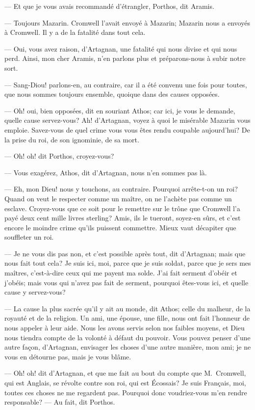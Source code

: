 — Et que je vous avais recommandé d'étrangler, Porthos, dit Aramis.

— Toujours Mazarin. Cromwell l'avait envoyé à Mazarin; Mazarin nous a envoyés à Cromwell. Il y a de la fatalité dans tout cela.

— Oui, vous avez raison, d'Artagnan, une fatalité qui nous divise et qui nous perd. Ainsi, mon cher Aramis, n'en parlons plus et préparons-nous à subir notre sort.

— Sang-Diou! parlons-en, au contraire, car il a été convenu une fois pour toutes, que nous sommes toujours ensemble, quoique dans des causes opposées.

— Oh! oui, bien opposées, dit en souriant Athos; car ici, je vous le demande, quelle cause servez-vous? Ah! d'Artagnan, voyez à quoi le misérable Mazarin vous emploie. Savez-vous de quel crime vous vous êtes rendu coupable aujourd'hui? De la prise du roi, de son ignominie, de sa mort.

— Oh! oh! dit Porthos, croyez-vous?

— Vous exagérez, Athos, dit d'Artagnan, nous n'en sommes pas là.

— Eh, mon Dieu! nous y touchons, au contraire. Pourquoi arrête-t-on un roi? Quand on veut le respecter comme un maître, on ne l'achète pas comme un esclave. Croyez-vous que ce soit pour le remettre sur le trône que Cromwell l'a payé deux cent mille livres sterling? Amis, ils le tueront, soyez-en sûrs, et c'est encore le moindre crime qu'ils puissent commettre. Mieux vaut décapiter que souffleter un roi.

— Je ne vous dis pas non, et c'est possible après tout, dit d'Artagnan; mais que nous fait tout cela? Je suis ici, moi, parce que je suis soldat, parce que je sers mes maîtres, c'est-à-dire ceux qui me payent ma solde. J'ai fait serment d'obéir et j'obéis; mais vous qui n'avez pas fait de serment, pourquoi êtes-vous ici, et quelle cause y servez-vous?

— La cause la plus sacrée qu'il y ait au monde, dit Athos; celle du malheur, de la royauté et de la religion. Un ami, une épouse, une fille, nous ont fait l'honneur de nous appeler à leur aide. Nous les avons servis selon nos faibles moyens, et Dieu nous tiendra compte de la volonté à défaut du pouvoir. Vous pouvez penser d'une autre façon, d'Artagnan, envisager les choses d'une autre manière, mon ami; je ne vous en détourne pas, mais je vous blâme.

— Oh! oh! dit d'Artagnan, et que me fait au bout du compte que M.~Cromwell, qui est Anglais, se révolte contre son roi, qui est
Écossais? Je suis Français, moi, toutes ces choses ne me regardent pas. Pourquoi donc voudriez-vous m'en rendre responsable?
— Au fait, dit Porthos.

